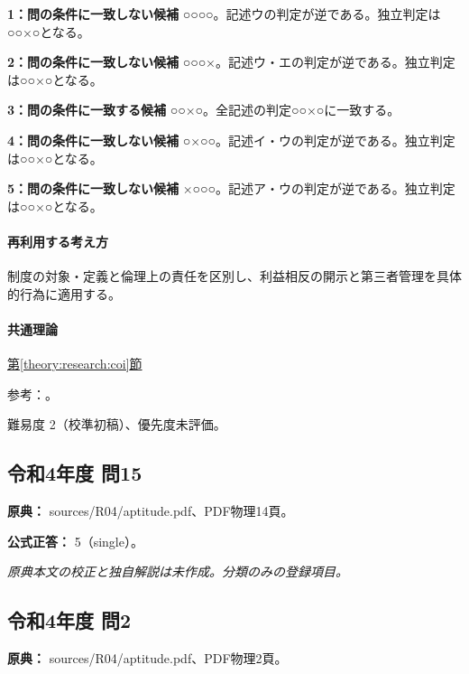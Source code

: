 \noindent\textbf{1：問の条件に一致しない候補} ○○○○。記述ウの判定が逆である。独立判定は○○×○となる。\par

\noindent\textbf{2：問の条件に一致しない候補} ○○○×。記述ウ・エの判定が逆である。独立判定は○○×○となる。\par

\noindent\textbf{3：問の条件に一致する候補} ○○×○。全記述の判定○○×○に一致する。\par

\noindent\textbf{4：問の条件に一致しない候補} ○×○○。記述イ・ウの判定が逆である。独立判定は○○×○となる。\par

\noindent\textbf{5：問の条件に一致しない候補} ×○○○。記述ア・ウの判定が逆である。独立判定は○○×○となる。\par

\paragraph{再利用する考え方} 制度の対象・定義と倫理上の責任を区別し、利益相反の開示と第三者管理を具体的行為に適用する。

\paragraph{共通理論} \hyperref[theory:research:coi]{第\ref*{theory:research:coi}節}

\par 参考：\cite{jsps_integrity2025}。

\par 難易度 2（校準初稿）、優先度未評価。

\subsection{令和4年度 問15}
\label{q:r04-reg-apt-15}

\noindent\textbf{原典：} sources/R04/aptitude.pdf、PDF物理14頁。

\textbf{公式正答：} 5（single）。

\par\textit{原典本文の校正と独自解説は未作成。分類のみの登録項目。}

\subsection{令和4年度 問2}
\label{q:r04-reg-apt-02}

\noindent\textbf{原典：} sources/R04/aptitude.pdf、PDF物理2頁。

